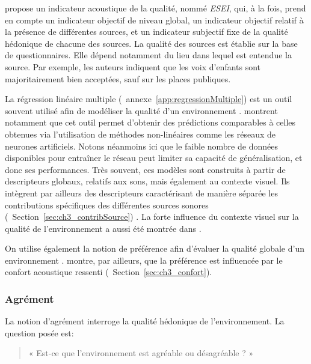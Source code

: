 \citep{garcia2012validation} propose un indicateur acoustique de la qualité, nommé \emph{ESEI}, qui, à la fois, prend en compte un indicateur objectif de niveau global, un indicateur objectif relatif à la présence de différentes sources, et un indicateur subjectif fixe de la qualité hédonique de chacune des sources. La qualité des sources est établie sur la base de questionnaires. Elle dépend notamment du lieu dans lequel est entendue la source. Par exemple, les auteurs indiquent que les voix d'enfants sont majoritairement bien acceptées, sauf sur les places publiques.

La régression linéaire multiple (\cf~annexe~\ref{app:regressionMultiple}) est un outil souvent utilisé afin de modéliser la qualité d'un environnement \citep{ricciardi2015sound}. \citep{brocolini2012prediction} montrent notamment que cet outil permet d'obtenir des prédictions comparables à celles obtenues via l'utilisation de méthodes non-linéaires comme les réseaux de neurones artificiels. Notons néanmoins ici que le faible nombre de données disponibles pour entraîner le réseau peut limiter sa capacité de généralisation, et donc ses performances. Très souvent, ces modèles sont construits à partir de descripteurs globaux, relatifs aux sons, mais également au contexte visuel. Ils intègrent par ailleurs des descripteurs caractérisant de manière séparée les contributions spécifiques des différentes sources sonores (\cf~Section~\ref{sec:ch3_contribSource}) \citep{ricciardi2015sound,brocolini2012prediction}. La forte influence du contexte visuel sur la qualité de l'environnement a aussi été montrée dans \citep{hong2013designing}.

On utilise également la notion de préférence afin d'évaluer la qualité globale d'un environnement \citep{yu2010factors}. \citep{hong2013designing} montre, par ailleurs, que la préférence est influencée par le confort acoustique ressenti (\cf~Section~\ref{sec:ch3_confort}).\\



\subsubsection{Agrément}

La notion d'agrément interroge la qualité hédonique de l'environnement. La question posée est:

\begin{quote}
« Est-ce que l'environnement est agréable ou désagréable ? »
\end{quote}
 
